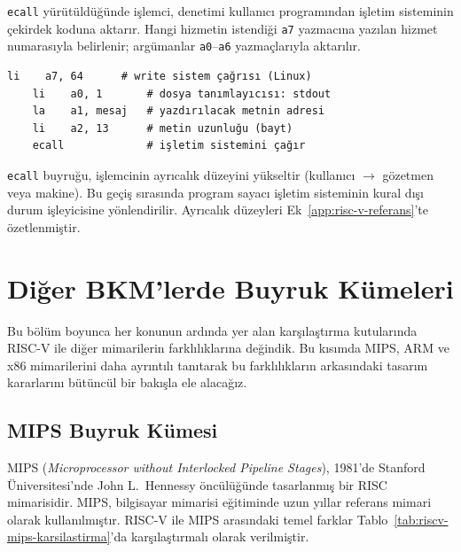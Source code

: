 \texttt{ecall} yürütüldüğünde işlemci, denetimi kullanıcı programından işletim sisteminin çekirdek koduna aktarır. Hangi hizmetin istendiği \texttt{a7} yazmacına yazılan hizmet numarasıyla belirlenir; argümanlar \texttt{a0}--\texttt{a6} yazmaçlarıyla aktarılır.

\begin{lstlisting}[style=riscv]
    li    a7, 64      # write sistem çağrısı (Linux)
    li    a0, 1       # dosya tanımlayıcısı: stdout
    la    a1, mesaj   # yazdırılacak metnin adresi
    li    a2, 13      # metin uzunluğu (bayt)
    ecall             # işletim sistemini çağır
\end{lstlisting}

\begin{bilginot}
\texttt{ecall} buyruğu, işlemcinin ayrıcalık düzeyini yükseltir (kullanıcı $\to$ gözetmen veya makine). Bu geçiş sırasında program sayacı işletim sisteminin kural dışı durum işleyicisine yönlendirilir. Ayrıcalık düzeyleri Ek~\ref{app:risc-v-referans}'te özetlenmiştir.
\end{bilginot}

\section{Diğer BKM'lerde Buyruk Kümeleri}
\label{sec:diger-isa}

Bu bölüm boyunca her konunun ardında yer alan karşılaştırma kutularında RISC-V ile diğer mimarilerin farklılıklarına değindik. Bu kısımda MIPS, ARM ve x86 mimarilerini daha ayrıntılı tanıtarak bu farklılıkların arkasındaki tasarım kararlarını bütüncül bir bakışla ele alacağız.


\subsection{MIPS Buyruk Kümesi}

MIPS (\textit{Microprocessor without Interlocked Pipeline Stages}), 1981'de Stanford Üniversitesi'nde John L.\ Hennessy öncülüğünde tasarlanmış bir RISC mimarisidir. MIPS, bilgisayar mimarisi eğitiminde uzun yıllar referans mimari olarak kullanılmıştır. RISC-V ile MIPS arasındaki temel farklar Tablo~\ref{tab:riscv-mips-karsilastirma}'da karşılaştırmalı olarak verilmiştir.

